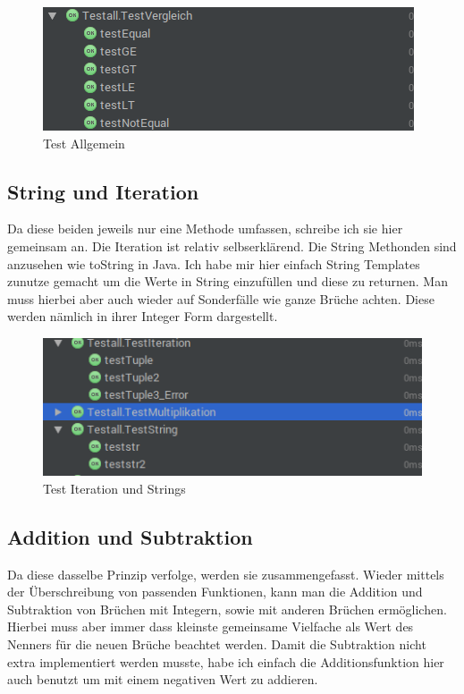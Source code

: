 \begin{figure}[!h]
	\begin{center}
		\includegraphics[width=0.6\linewidth]{images/testV.png}
		\caption{Test Allgemein}
		\label{broker}
	\end{center}
\end{figure}

\subsection{String und Iteration}
Da diese beiden jeweils nur eine Methode umfassen, schreibe ich sie hier gemeinsam an. Die Iteration ist relativ selbserklärend. Die String Methonden sind anzusehen wie toString in Java. Ich habe mir hier einfach String Templates zunutze gemacht um die Werte in String einzufüllen und diese zu returnen. Man muss hierbei aber auch wieder auf Sonderfälle wie ganze Brüche achten. Diese werden nämlich in ihrer Integer Form dargestellt.

\begin{figure}[!h]
	\begin{center}
		\includegraphics[width=0.6\linewidth]{images/testB.png}
		\caption{Test Iteration und Strings}
		\label{broker}
	\end{center}
\end{figure}


\clearpage

\subsection{Addition und Subtraktion}
Da diese dasselbe Prinzip verfolge, werden sie zusammengefasst. Wieder mittels der Überschreibung von passenden Funktionen, kann man die Addition und Subtraktion von Brüchen mit Integern, sowie mit anderen Brüchen ermöglichen. Hierbei muss aber immer dass kleinste gemeinsame Vielfache als Wert des Nenners für die neuen Brüche beachtet werden. Damit die Subtraktion nicht extra implementiert werden musste, habe ich einfach die Additionsfunktion hier auch benutzt um mit einem negativen Wert zu addieren.

